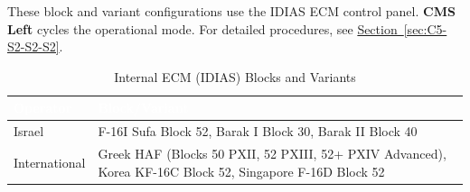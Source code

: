 \documentclass[11pt, a4paper, twoside]{report}
\newcommand{\secref}[1]{\hyperref[#1]{Section~\ref*{#1}}}
\begin{document}
These block and variant configurations use the IDIAS ECM control panel. \textbf{CMS Left} cycles the operational mode. For detailed procedures, see \secref{sec:C5-S2-S2-S2}.

\begin{table}[H]
\centering
\caption{Internal ECM (IDIAS) Blocks and Variants}
\label{tab:C5-S3-internal-ecm}
\small
\renewcommand{\arraystretch}{1.25}
\begin{tabular}{|>{\raggedright\arraybackslash}p{3.0cm}|>{\raggedright\arraybackslash}p{5.8cm}|}
\hline
\rowcolor{headerblue}
\textcolor{white}{\textbf{Operator}} & \textcolor{white}{\textbf{Block/Variant}} \\
\hline
Israel & F-16I Sufa Block 52, Barak I Block 30, Barak II Block 40 \\
\hline
International & Greek HAF (Blocks 50 PXII, 52 PXIII, 52+ PXIV Advanced),
Korea KF-16C Block 52, Singapore F-16D Block 52 \\
\hline
\end{tabular}
\end{table}

\end{document}
